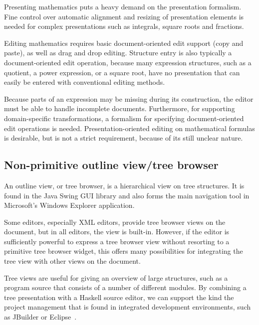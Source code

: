
Presenting mathematics puts a heavy demand on the presentation formalism. Fine control over automatic alignment and resizing of presentation elements is needed for complex presentations such as integrals, square roots and fractions. 

Editing mathematics requires basic document-oriented edit support (copy and paste), as well as drag and drop editing. Structure entry is also typically a document-oriented edit operation, because many expression structures, such as a quotient, a power expression, or a square root, have no presentation that can easily be entered with conventional editing methods.

Because parts of an expression may be missing during its construction,  the editor must be able to handle incomplete documents. Furthermore, for supporting domain-specific transformations, a formalism for specifying document-oriented edit operations is needed. Presentation-oriented editing on mathematical formulas is desirable, but is not a strict requirement, because of its still unclear nature.

%																
\subsection{Non-primitive outline view/tree browser}\label{sect:treeBrowser}

An outline view, or tree browser, is a hierarchical view on tree structures. It is found in the Java Swing GUI library and also forms the main navigation tool in Microsoft's Windows Explorer application. 


Some editors, especially XML editors, provide tree browser views on the document, but in all editors, the view is built-in. However, if the editor is sufficiently powerful to express a tree browser view without resorting to a primitive tree browser widget, this offers many possibilities for integrating the tree view with other views on the document. 


Tree views are useful for giving an overview of large structures, such as a program source that consists of a number of different modules. By combining a tree presentation with a Haskell source editor, we can support the kind the project management that is found in integrated development environments, such as JBuilder or Eclipse~\cite{eclipse2001}. 

